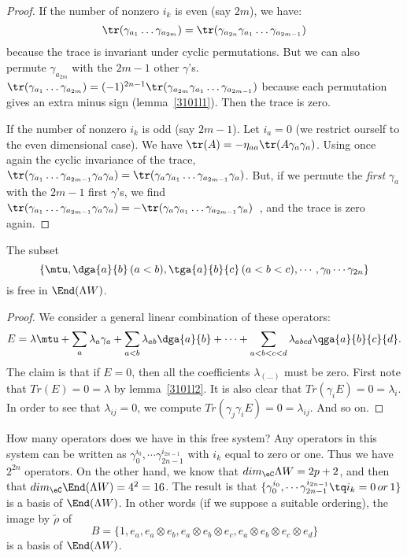 \begin{proof}
 If the number of nonzero $i_k$ is even (say $2m$), we have:
\[
	\tr(\gamma_{a_1}\ldots\gamma_{a_{2m}})=\tr(\gamma_{a_{2n}}\gamma_{a_1}\ldots\gamma_{a_{2m-1}})
\]
because the trace is invariant under cyclic permutations. But we can also permute $\gamma_{a_{2m}}$ with the $2m-1$ other $\gamma$'s.  $\tr(\gamma_{a_1}\ldots\gamma_{a_{2m}})=(-1)^{2n-1}\tr(\gamma_{a_{2m}}\gamma_{a_1}\ldots\gamma_{a_{2m-1}})$ because each permutation gives an extra minus sign (\hbox{lemma~\ref{3101l1}}). Then the trace is zero.

If the number of nonzero $i_k$ is odd (say $2m-1$). Let $i_a=0$ (we restrict ourself to the even dimensional case). We have $\tr(A)=-\eta_{aa}\tr(A\gamma_a\gamma_a)$. Using once again the cyclic invariance of the trace, $\tr(\gamma_{a_1}\ldots\gamma_{a_{2m-1}}\gamma_a\gamma_a)=\tr(\gamma_a\gamma_{a_1}\ldots\gamma_{a_{2m-1}}\gamma_a)$. But, if we permute the \emph{first} $\gamma_a$ with the $2m-1$ first $\gamma$'s, we find \hbox{$\tr(\gamma_{a_1}\ldots\gamma_{a_{2m-1}}\gamma_a\gamma_a)=-\tr(\gamma_a\gamma_{a_1}\ldots\gamma_{a_{2m-1}}\gamma_a)$ }, and the trace is zero again.
\end{proof}

\begin{proposition}
The subset
\[
	\left\{\mtu,\dga{a}{b}\,(a<b),\tga{a}{b}{c}\,(a<b<c), \cdots, \gamma_{0}\cdots\gamma_{2n} \right\}
\]
 is free in $\End(\Lambda W)$.
\end{proposition}

\begin{proof}
We consider a general linear combination of these operators:
\[
 E=\lambda\mtu+\sum_a\lambda_a\gamma_a+\sum_{a<b}\lambda_{ab}\dga{a}{b}+\cdots+
 \sum_{a<b<c<d}\lambda_{abcd}\qga{a}{b}{c}{d}.
\]
The claim is that if $E=0$, then all the coefficients $\lambda_{(\ldots)}$ must be zero. First note that $Tr(E)=0=\lambda$ by lemma~\ref{3101l2}. It is also clear that $Tr(\gamma_iE)=0=\lambda_i$. In order to see that $\lambda_{ij}=0$, we compute $Tr(\gamma_j\gamma_iE)=0=\lambda_{ij}$. And so on.
\end{proof}

How many operators does we have in this free system? Any operators in this system can be written as $\gamma_{0}^{i_{0}},\cdots\gamma^{i_{2n-1}}_{2n-1}$ with $i_k$ equal to zero or one. Thus we have $2^{2n}$ operators. On the other hand, we know that $dim_{\eC}\Lambda W=2p+2$, and then that $dim_{\eC}\End(\Lambda W)=4^2=16$. The result is that $\{ \gamma_{0}^{i_{0}},\cdots\gamma^{i_{2n-1}}_{2n-1}  \tq i_k=0\,or\,1\}$ is a basis of $\End(\Lambda W)$. In other words (if we suppose a suitable ordering), the image by $\tilde\rho$ of
\[
B=\{1,e_a,e_a\otimes e_b,e_a\otimes e_b\otimes e_c,e_a\otimes e_b\otimes e_c\otimes e_d\}
\]
 is a basis of $\End(\Lambda W)$.

